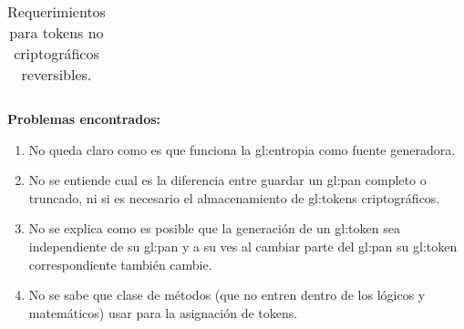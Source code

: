 \begin{table}[H]
\begin{tabular}{| p{5.5cm} | p{2cm} | p{4cm} | p{4cm} |}
  \end{tabular}
  \caption{Requerimientos para tokens no criptográficos reversibles.}
\end{table}

\textbf{Problemas encontrados:}

\begin{enumerate}
  
  \item \label{pbl1} 
  No queda claro como es que funciona la \gls{gl:entropia} como fuente 
  generadora.
  
  \item \label{pbl2} 
  No se entiende cual es la diferencia entre guardar un \gls{gl:pan} 
  completo o truncado, ni si es necesario el almacenamiento de 
  \glspl{gl:token} criptográficos.
  
  \item \label{pbl3} 
  No se explica como es posible que la generación de un \gls{gl:token} 
  sea independiente de su \gls{gl:pan} y a su ves al cambiar parte del 
  \gls{gl:pan} su \gls{gl:token} correspondiente también cambie.
  
  \item \label{pbl4} 
  No se sabe que clase de métodos (que no entren dentro de los lógicos y 
  matemáticos) usar para la asignación de tokens. 

\end{enumerate}
